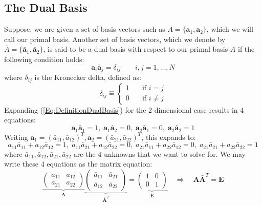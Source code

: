 \subsection{The Dual Basis}
Suppose, we are given a set of basis vectors such as $A = \{ \mathbf{a}_1, \mathbf{a}_2 \}$, which we will call our primal basis. Another set of basis vectors, which we denote by $\bar{A} = \{ \bar{\mathbf{a}}_1, \bar{\mathbf{a}}_2 \}$, is said to be a dual basis with respect to our primal basis $A$ if the following condition holds:
\begin{equation}
\label{Eq:DefinitionDualBasis}
 \mathbf{a}_i \bar{\mathbf{a}}_j 
 = \delta_{ij}  \qquad i, j = 1, \ldots, N
\end{equation}
where $\delta_{ij}$ is the Kronecker delta, defined as: 
\begin{equation}
\label{Eq:KroneckerDelta}
\boxed
{
 \delta_{ij}
 \hat{=}
 \begin{cases}
  1 & \quad \text{if } i = j \\
  0 & \quad \text{if } i \neq j
 \end{cases}
}
\end{equation}
Expanding (\ref{Eq:DefinitionDualBasis}) for the 2-dimensional case results in 4 equations:
\begin{equation}
 \mathbf{a}_1 \bar{\mathbf{a}}_1 = 1, \;
 \mathbf{a}_1 \bar{\mathbf{a}}_2 = 0, \;
 \mathbf{a}_2 \bar{\mathbf{a}}_1 = 0, \;
 \mathbf{a}_2 \bar{\mathbf{a}}_2 = 1 
\end{equation}
Writing $\bar{\mathbf{a}}_1 = (\bar{a}_{11}, \bar{a}_{12})^T, \bar{\mathbf{a}}_2 = (\bar{a}_{21}, \bar{a}_{22})^T$, this expands to:
\begin{equation}
 a_{11} \bar{a}_{11} + a_{12} \bar{a}_{12} = 1, \;
 a_{11} \bar{a}_{21} + a_{12} \bar{a}_{22} = 0, \;
 a_{21} \bar{a}_{11} + a_{22} \bar{a}_{12} = 0, \;
 a_{21} \bar{a}_{21} + a_{22} \bar{a}_{22} = 1
\end{equation}
where $\bar{a}_{11}, \bar{a}_{12}, \bar{a}_{21}, \bar{a}_{22}$ are the 4 unknowns that we want to solve for. We may write these 4 equations as the matrix equation:
\begin{equation}
 \underbrace{
 \begin{pmatrix} 
  a_{11} & a_{12} \\
  a_{21} & a_{22} 
 \end{pmatrix} 
 }_{\mathbf{A}}
 \underbrace{
 \begin{pmatrix} 
  \bar{a}_{11} & \bar{a}_{21} \\
  \bar{a}_{12} & \bar{a}_{22}
 \end{pmatrix} 
 }_{\bar{\mathbf{A}}^T} 
 =
 \underbrace{
 \begin{pmatrix} 
   1 & 0 \\
   0 & 1
 \end{pmatrix} 
 }_{\mathbf{E}} 
 \quad \Rightarrow \quad \mathbf{A} \bar{\mathbf{A}}^T = \mathbf{E}
\end{equation}
